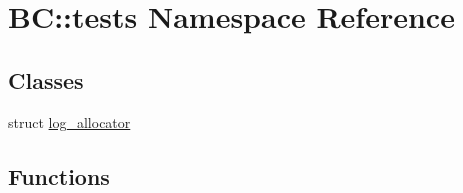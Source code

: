 \hypertarget{namespaceBC_1_1tests}{}\section{BC\+:\+:tests Namespace Reference}
\label{namespaceBC_1_1tests}
\subsection*{Classes}
\begin{DoxyCompactItemize}
\item 
struct \hyperlink{structBC_1_1tests_1_1log__allocator}{log\+\_\+allocator}
\end{DoxyCompactItemize}
\subsection*{Functions}
